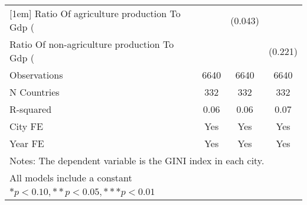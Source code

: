 {\begin{tabular}{l*{3}{c}}
[1em]
Ratio Of agriculture production To Gdp (%
                    &                     &     (0.043)         &                     \\
[1em]
Ratio Of non-agriculture production To Gdp (%
                    &                     &                     &     (0.221)         \\
\hline
Observations        &        6640         &        6640         &        6640         \\
N Countries         &         332         &         332         &         332         \\
R-squared           &        0.06         &        0.06         &        0.07         \\
City FE             &         Yes         &         Yes         &         Yes         \\
Year FE             &         Yes         &         Yes         &         Yes         \\
\hline\hline
\multicolumn{4}{l}{\footnotesize Notes: The dependent variable is the GINI index in each city.}\\
\multicolumn{4}{l}{\footnotesize All models include a constant}\\
\multicolumn{4}{l}{\footnotesize $* p<0.10, ** p<0.05, *** p<0.01$}\\
\end{tabular}
}
